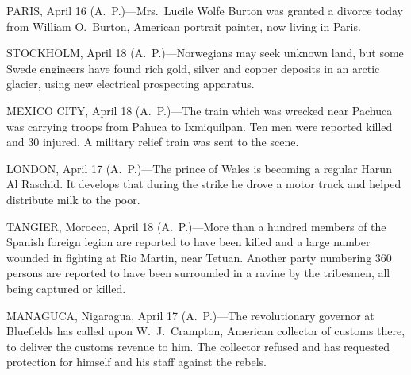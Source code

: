 \documentclass{newspaper1920}
\begin{document}
\begin{multicols}{3}



PARIS, April 16 (A.~P.)---Mrs.~Lucile Wolfe Burton was granted a
divorce today from William O.\ Burton, American portrait painter, now
living in Paris.

\halfrule


STOCKHOLM, April 18 (A.~P.)---Norwegians may seek unknown land, but
some Swede engineers have found rich gold, silver and copper deposits
in an arctic glacier, using new electrical prospecting apparatus.

\halfrule


MEXICO CITY, April 18 (A.~P.)---The train which was wrecked near
Pachuca was carrying troops from Pahuca to Ixmiquilpan.  Ten men were
reported killed and 30 injured.  A military relief train was sent to
the scene.

\halfrule


LONDON, April 17 (A.~P.)---The prince of Wales is becoming a regular
Harun Al Raschid.  It develops that during the strike he drove a motor
truck and helped distribute milk to the poor.

\halfrule


TANGIER, Morocco, April 18 (A.~P.)---More than a hundred members of
the Spanish foreign legion are reported to have been killed and a
large number wounded in fighting at Rio Martin, near Tetuan.  Another
party numbering 360 persons are reported to have been surrounded in a
ravine by the tribesmen, all being captured or killed.

\halfrule


MANAGUCA, Nigaragua, April 17 (A.~P.)---The revolutionary governor at
Bluefields has called upon W.~J.~Crampton, American collector of
customs there, to deliver the customs revenue to him.  The collector
refused and has requested protection for himself and his staff against
the rebels.

\fullrule



\end{multicols}
\end{document}
